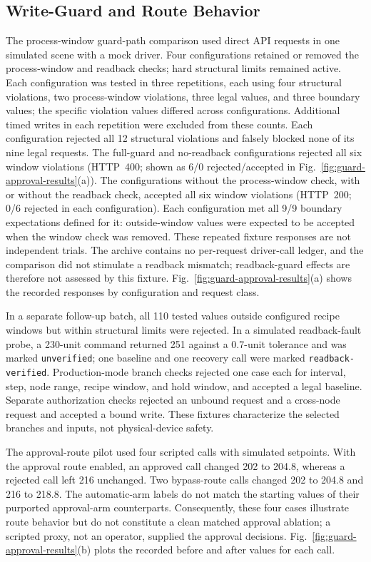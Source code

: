\subsection{Write-Guard and Route Behavior}
\label{sec:eval-ablation}
The process-window guard-path comparison used direct API requests in one simulated scene with a mock driver. Four configurations retained or removed the process-window and readback checks; hard structural limits remained active. Each configuration was tested in three repetitions, each using four structural violations, two process-window violations, three legal values, and three boundary values; the specific violation values differed across configurations. Additional timed writes in each repetition were excluded from these counts. Each configuration rejected all 12 structural violations and falsely blocked none of its nine legal requests. The full-guard and no-readback configurations rejected all six window violations (HTTP~400; shown as 6/0 rejected/accepted in Fig.~\ref{fig:guard-approval-results}(a)). The configurations without the process-window check, with or without the readback check, accepted all six window violations (HTTP~200; 0/6 rejected in each configuration). Each configuration met all 9/9 boundary expectations defined for it: outside-window values were expected to be accepted when the window check was removed. These repeated fixture responses are not independent trials. The archive contains no per-request driver-call ledger, and the comparison did not stimulate a readback mismatch; readback-guard effects are therefore not assessed by this fixture. Fig.~\ref{fig:guard-approval-results}(a) shows the recorded responses by configuration and request class.

In a separate follow-up batch, all 110 tested values outside configured recipe windows but within structural limits were rejected. In a simulated readback-fault probe, a 230-unit command returned 251 against a 0.7-unit tolerance and was marked \texttt{unverified}; one baseline and one recovery call were marked \texttt{readback-verified}. Production-mode branch checks rejected one case each for interval, step, node range, recipe window, and hold window, and accepted a legal baseline. Separate authorization checks rejected an unbound request and a cross-node request and accepted a bound write. These fixtures characterize the selected branches and inputs, not physical-device safety.

The approval-route pilot used four scripted calls with simulated setpoints. With the approval route enabled, an approved call changed 202 to 204.8, whereas a rejected call left 216 unchanged. Two bypass-route calls changed 202 to 204.8 and 216 to 218.8. The automatic-arm labels do not match the starting values of their purported approval-arm counterparts. Consequently, these four cases illustrate route behavior but do not constitute a clean matched approval ablation; a scripted proxy, not an operator, supplied the approval decisions. Fig.~\ref{fig:guard-approval-results}(b) plots the recorded before and after values for each call.

